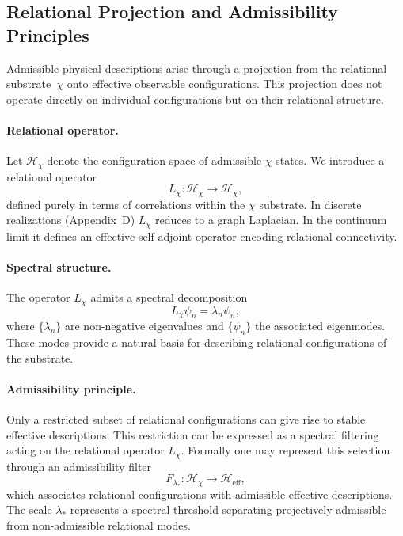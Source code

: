 \subsection{Relational Projection and Admissibility Principles}
  \label{subsec:relational-projection}

  Admissible physical descriptions arise through a projection from the
  relational substrate~$\chi$ onto effective observable configurations.
  This projection does not operate directly on individual configurations
  but on their relational structure.

  \paragraph{Relational operator.}
    Let $\mathcal{H}_\chi$ denote the configuration space of admissible
    $\chi$ states.
    We introduce a relational operator
    \begin{equation}
      L_\chi : \mathcal{H}_\chi \rightarrow \mathcal{H}_\chi ,
    \end{equation}
    defined purely in terms of correlations within the $\chi$ substrate.
    In discrete realizations (Appendix~D) $L_\chi$ reduces to a graph
    Laplacian.
    In the continuum limit it defines an effective self-adjoint operator
    encoding relational connectivity.

  \paragraph{Spectral structure.}
    The operator $L_\chi$ admits a spectral decomposition
    \begin{equation}
      L_\chi \psi_n = \lambda_n \psi_n ,
    \end{equation}
    where $\{\lambda_n\}$ are non-negative eigenvalues and $\{\psi_n\}$ the
    associated eigenmodes.
    These modes provide a natural basis for describing relational
    configurations of the substrate.

  \paragraph{Admissibility principle.}
    Only a restricted subset of relational configurations can give rise
    to stable effective descriptions.
    This restriction can be expressed as a spectral filtering acting on
    the relational operator $L_\chi$.
    Formally one may represent this selection through an admissibility
    filter
    \begin{equation}
      F_{\lambda_*} : \mathcal{H}_\chi \rightarrow \mathcal{H}_{\mathrm{eff}},
    \end{equation}
    which associates relational configurations with admissible effective
    descriptions.
    The scale $\lambda_*$ represents a spectral threshold separating
    projectively admissible from non-admissible relational modes.

